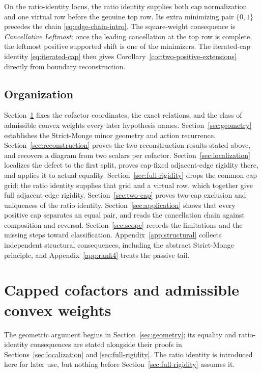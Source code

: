 \documentclass[11pt,a4paper]{amsart}
\numberwithin{equation}{section}
\theoremstyle{plain}
\theoremstyle{definition}
\begin{document}
On the ratio-identity locus, the ratio identity supplies both cap
normalization and one virtual row before the genuine top row.  Its extra
minimizing pair \(\{0,1\}\) precedes the chain
\eqref{eq:edge-chain-intro}.  The square-weight consequence is
\emph{Cancellative Leftmost}: once the leading cancellation at the top row
is complete, the leftmost positive supported shift is one of the minimizers.
The iterated-cap identity \eqref{eq:iterated-cap} then gives
Corollary~\ref{cor:two-positive-extensions} directly from boundary
reconstruction.

\subsection{Organization}

Section~\ref{sec:coordinates} fixes the cofactor coordinates, the exact
relations, and the class of admissible convex weights every later hypothesis
names.  Section~\ref{sec:geometry} establishes the Strict-Monge minor
geometry and action recurrence.  Section~\ref{sec:reconstruction} proves the
two reconstruction results stated above, and recovers a diagram from two
scalars per cofactor.  Section~\ref{sec:localization} localizes
the defect to the first split, proves cap-fixed adjacent-edge rigidity
there, and applies it to actual equality.
Section~\ref{sec:full-rigidity} drops the common cap grid: the ratio
identity supplies that grid and a virtual row, which together give full
adjacent-edge rigidity.  Section~\ref{sec:two-cap} proves two-cap
exclusion and uniqueness of the ratio identity.
Section~\ref{sec:application} shows that every positive cap separates an
equal pair, and reads the cancellation chain against composition and
reversal.  Section~\ref{sec:scope} records the limitations and the
missing steps toward classification.  Appendix~\ref{app:structural} collects
independent structural consequences, including the abstract Strict-Monge
principle, and Appendix~\ref{app:rank4} treats the passive tail.

\section{Capped cofactors and admissible convex weights}\label{sec:coordinates}

The geometric argument begins in
Section~\ref{sec:geometry}; its equality and ratio-identity consequences are
stated alongside their proofs in Sections~\ref{sec:localization} and
\ref{sec:full-rigidity}.  The ratio identity is introduced here for later
use, but nothing before Section~\ref{sec:full-rigidity} assumes it.
\end{document}
